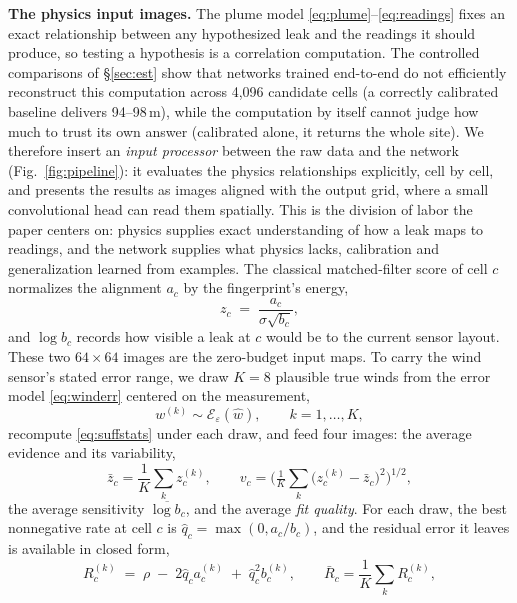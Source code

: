 \documentclass[conference]{IEEEtran}
\begin{document}
\textbf{The physics input images.}\label{sec:maps} The plume model \eqref{eq:plume}--\eqref{eq:readings} fixes an exact
relationship between any hypothesized leak and the readings it should
produce, so testing a hypothesis is a correlation computation. The
controlled comparisons of \S\ref{sec:est} show that networks trained
end-to-end do not efficiently reconstruct this computation across
4{,}096 candidate cells (a correctly calibrated baseline delivers
94--98\,m), while the computation by itself cannot judge how much to
trust its own answer (calibrated alone, it returns the whole site). We
therefore insert an \emph{input processor} between the raw data and the
network (Fig.~\ref{fig:pipeline}): it evaluates the physics
relationships explicitly, cell by cell, and presents the results as
images aligned with the output grid,
where a small convolutional head can read them spatially. This is the
division of labor the paper centers on: physics supplies exact
understanding of how a leak maps to readings, and the network supplies
what physics lacks, calibration and generalization learned from
examples. The classical matched-filter score of cell $c$ normalizes the
alignment $a_c$ by the fingerprint's energy,
\begin{equation}
\label{eq:zmap}
z_c \;=\; \frac{a_c}{\sigma \sqrt{b_c}},
\end{equation}
and $\log b_c$ records how visible a leak at $c$ would be to the current
sensor layout. These two $64{\times}64$ images are the zero-budget input
maps. To carry the wind sensor's stated error range, we draw $K{=}8$
plausible true winds from the error model \eqref{eq:winderr} centered on
the measurement,
\begin{equation}
\label{eq:draws}
w^{(k)} \sim \mathcal{E}_{\varepsilon}(\hat w), \qquad k = 1,\dots,K,
\end{equation}
recompute \eqref{eq:suffstats} under each draw, and feed four images: the
average evidence and its variability,
\begin{equation}
\label{eq:moments}
\bar z_c = \frac{1}{K}\sum_{k} z_c^{(k)}, \qquad
v_c = \Big(\tfrac{1}{K}\sum_{k}\big(z_c^{(k)} - \bar z_c\big)^2\Big)^{1/2},
\end{equation}
the average sensitivity $\overline{\log b_c}$, and the average
\emph{fit quality}. For each draw, the best nonnegative rate at cell $c$
is $\hat q_c = \max(0, a_c/b_c)$, and the residual error it leaves is
available in closed form,
\begin{equation}
\label{eq:resid}
R_c^{(k)} \;=\; \rho \;-\; 2\hat q_c a_c^{(k)} \;+\; \hat q_c^2 b_c^{(k)},
\qquad
\bar R_c = \frac{1}{K}\sum_k R_c^{(k)},
\end{equation}
\end{document}
